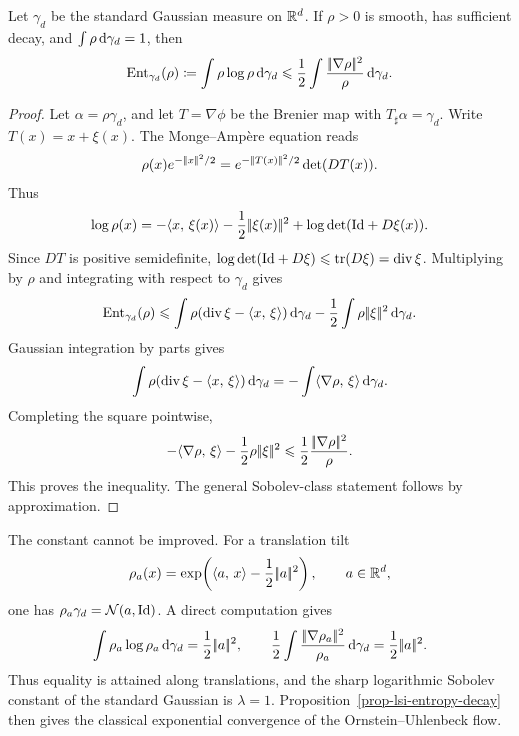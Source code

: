 \begin{prop}\label{prop-gaussian-log-sobolev-ot}
	Let \(\gamma_d\) be the standard Gaussian measure on \(\mathbb{R}^d\). If \(\rho>0\) is smooth, has sufficient decay, and \(\int \rho\,\mathrm{d}\gamma_d=1\), then
	\[
		\mathrm{Ent}_{\gamma_d}(\rho)
		\coloneqq
		\int \rho\log \rho\,\mathrm{d}\gamma_d
		\leqslant
		\frac12\int \frac{|\!| \nabla \rho |\!|^2}{\rho}\,\mathrm{d}\gamma_d.
	\]
\end{prop}

\begin{proof}
	Let \(\alpha=\rho\gamma_d\), and let \(T=\nabla\phi\) be the Brenier map with \(T_\sharp\alpha=\gamma_d\). Write \(T(x)=x+\xi(x)\). The Monge--Amp\`ere equation reads
	\[
		\rho(x)e^{-|\!| x |\!|^2/2}
		=
		e^{-|\!| T(x) |\!|^2/2}\det(DT(x)).
	\]
	Thus
	\[
		\log \rho(x)
		=
		-\langle x,\,\xi(x)\rangle
		-\frac12|\!| \xi(x) |\!|^2
		+
		\log\det(\mathrm{Id}+D\xi(x)).
	\]
	Since \(DT\) is positive semidefinite, \(\log\det(\mathrm{Id}+D\xi)\leqslant\operatorname{tr}(D\xi)=\operatorname{div}\xi\). Multiplying by \(\rho\) and integrating with respect to \(\gamma_d\) gives
	\[
		\mathrm{Ent}_{\gamma_d}(\rho)
		\leqslant
		\int \rho(\operatorname{div}\xi-\langle x,\,\xi\rangle)\,\mathrm{d}\gamma_d
		-\frac12\int \rho|\!| \xi |\!|^2\,\mathrm{d}\gamma_d.
	\]
	Gaussian integration by parts gives
	\[
		\int \rho(\operatorname{div}\xi-\langle x,\,\xi\rangle)\,\mathrm{d}\gamma_d
		=
		-\int\langle \nabla \rho,\,\xi\rangle\,\mathrm{d}\gamma_d.
	\]
	Completing the square pointwise,
	\[
		-\langle \nabla \rho,\,\xi\rangle-\frac12 \rho|\!| \xi |\!|^2
		\leqslant
		\frac12\frac{|\!| \nabla \rho |\!|^2}{\rho}.
	\]
	This proves the inequality. The general Sobolev-class statement follows by approximation.
\end{proof}

The constant cannot be improved. For a translation tilt
\[
	\rho_a(x)=\exp\!\left(\langle a,\,x\rangle-\frac12|\!| a |\!|^2\right),
	\qquad a\in\mathbb{R}^d,
\]
one has \(\rho_a\gamma_d=\mathcal{N}(a,\mathrm{Id})\). A direct computation gives
\[
	\int \rho_a\log \rho_a\,\mathrm{d}\gamma_d
	=
	\frac12|\!| a |\!|^2,
	\qquad
	\frac12\int\frac{|\!| \nabla \rho_a |\!|^2}{\rho_a}\,\mathrm{d}\gamma_d
	=
	\frac12|\!| a |\!|^2.
\]
Thus equality is attained along translations, and the sharp logarithmic Sobolev constant of the standard Gaussian is \(\lambda=1\). Proposition~\ref{prop-lsi-entropy-decay} then gives the classical exponential convergence of the Ornstein--Uhlenbeck flow.


